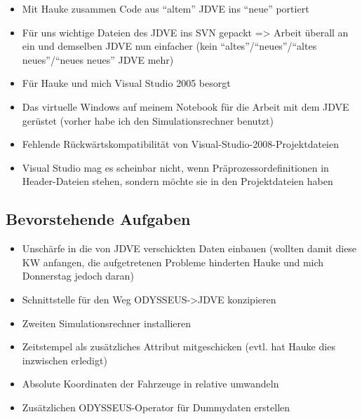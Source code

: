 \documentclass{scrartcl}  %
\renewenvironment{workToDo}{\subsection{Bevorstehende Aufgaben}}{}
\begin{document}
\week

\begin{workDone}
	\begin{itemize}
		\item Mit Hauke zusammen Code aus "`altem"' JDVE ins "`neue"' portiert
		\item Für uns wichtige Dateien des JDVE ins SVN gepackt => Arbeit überall an ein und demselben JDVE nun einfacher (kein "`altes"'/"`neues"'/"`altes neues"'/"`neues neues"' JDVE mehr)
		\item Für Hauke und mich Visual Studio 2005 besorgt
		\item Das virtuelle Windows auf meinem Notebook für die Arbeit mit dem JDVE gerüstet (vorher habe ich den Simulationsrechner benutzt)
	\end{itemize}
\end{workDone}

\begin{workProblems}
	\begin{itemize}
		\item Fehlende Rückwärtskompatibilität von Visual-Studio-2008-Projektdateien
		\item Visual Studio mag es scheinbar nicht, wenn Präprozessordefinitionen in Header-Dateien stehen, sondern möchte sie in den Projektdateien haben
	\end{itemize}
\end{workProblems}

\begin{workToDo}
	\begin{itemize}
		\item Unschärfe in die von JDVE verschickten Daten einbauen (wollten damit diese KW anfangen, die aufgetretenen Probleme hinderten Hauke und mich Donnerstag jedoch daran)
		\item Schnittstelle für den Weg ODYSSEUS->JDVE konzipieren
		\item Zweiten Simulationsrechner installieren
		\item Zeitstempel als zusätzliches Attribut mitgeschicken (evtl. hat Hauke dies inzwischen erledigt)
		\item Absolute Koordinaten der Fahrzeuge in relative umwandeln
		\item Zusätzlichen ODYSSEUS-Operator für Dummydaten erstellen
	\end{itemize}
\end{workToDo}
\end{document}
